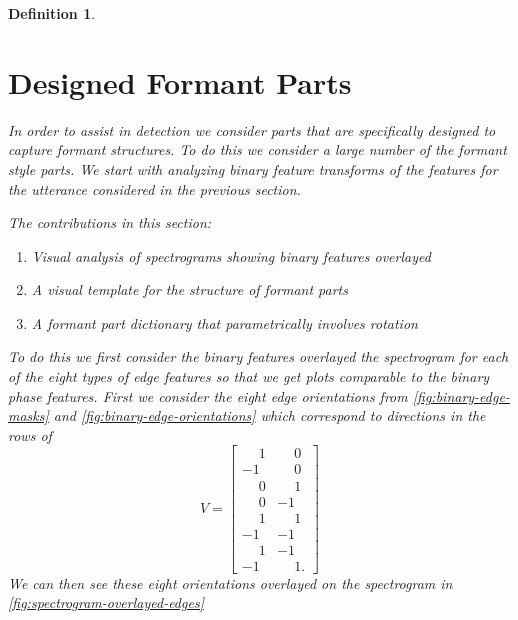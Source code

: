 \documentclass[english]{article}
\newtheorem{defn}{Definition}[section]
\begin{document}
\begin{defn}
\section{Designed Formant Parts}

In order to assist in detection we consider parts that are specifically designed to capture
formant structures. To do this we consider a large number of the formant style parts.
We start with analyzing binary feature transforms of the features for the utterance considered
in the previous section.

The contributions in this section:
\begin{enumerate}
\item Visual analysis of spectrograms showing binary features overlayed
\item A visual template for the structure of formant parts
\item A formant part dictionary that parametrically involves rotation
\end{enumerate}


To do this we first consider the binary features overlayed the spectrogram for each of the eight
types of edge features so that we get plots comparable to the binary phase features. First we consider the eight edge orientations from \autoref{fig:binary-edge-masks} and \autoref{fig:binary-edge-orientations}
which correspond to directions in the rows of
\begin{equation}
V = \begin{bmatrix} \phantom{-}1 & \phantom{-}0 \\
-1 & \phantom{-}0\\
\phantom{-}0 & \phantom{-}1 \\
\phantom{-}0 & -1\\
\phantom{-}1 & \phantom{-}1\\
-1 & -1\\
 \phantom{-}1 & -1\\
 -1 & \phantom{-}1.
\end{bmatrix}
\end{equation}
We can then see these eight orientations overlayed on
the spectrogram in \autoref{fig:spectrogram-overlayed-edges}


\end{defn}
\end{document}
